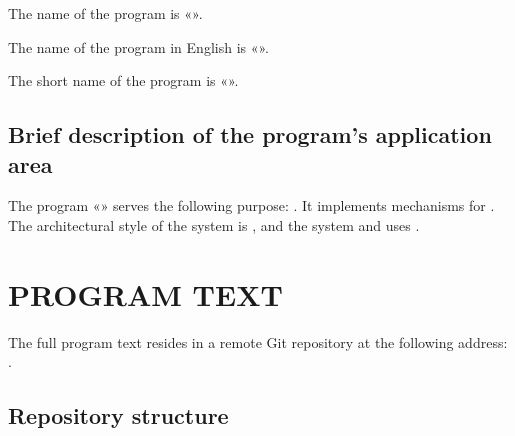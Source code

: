 \documentclass[12pt,a4paper]{extarticle}
\begin{document}
The name of the program is «\projectname».

The name of the program in English is «\hseProjectNameEn».

The short name of the program is «\hseProjectNameShort».

\subsection{Brief description of the program's application area}

The program «\projectname» serves the following purpose: . It implements mechanisms for . The architectural style of the system is , and the system and uses .

\clearpage

\section{PROGRAM TEXT}

The full program text resides in a remote Git repository at the following address: . 

\subsection{Repository structure}
\end{document}
